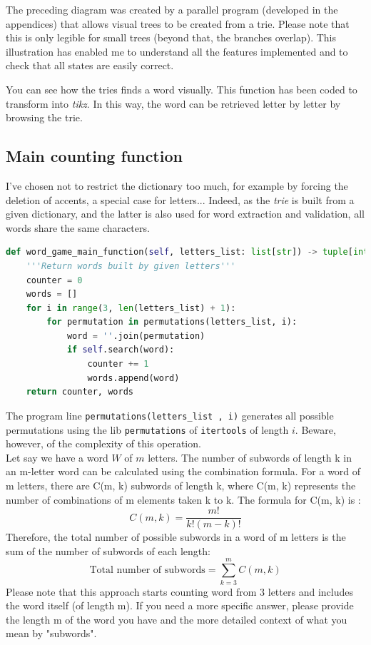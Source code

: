 \documentclass[10pt,a4paper,hidelinks]{article}
\begin{document}
The preceding diagram was created by a parallel program (developed in the appendices) that allows visual trees to be created from a trie. Please note that this is only legible for small trees (beyond that, the branches overlap). This illustration has enabled me to understand all the features implemented and to check that all states are easily correct.

You can see how the tries finds a word visually. This function has been coded to transform  into \textit{tikz}. In this way, the word can be retrieved letter by letter by browsing the trie.\\



\subsection{Main counting function}
I've chosen not to restrict the dictionary too much, for example by forcing the deletion of accents, a special case for letters... Indeed, as the \textit{trie} is built from a given dictionary, and the latter is also used for word extraction and validation, all words share the same characters.

\begin{lstlisting}[language=Python, caption=Test all permutations]
def word_game_main_function(self, letters_list: list[str]) -> tuple[int, list[str]]:
    '''Return words built by given letters'''
    counter = 0
    words = []
    for i in range(3, len(letters_list) + 1):
        for permutation in permutations(letters_list, i):
            word = ''.join(permutation)
            if self.search(word):
                counter += 1
                words.append(word)
    return counter, words
\end{lstlisting}

The program line \verb|permutations(letters_list , i)| generates all possible permutations using the lib \verb|permutations| of \verb|itertools| of length $i$. Beware, however, of the complexity of this operation.\\

Let say we have a word $W$ of $m$ letters.
The number of subwords of length k in an m-letter word can be calculated using the combination formula. For a word of m letters, there are C(m, k) subwords of length k, where C(m, k) represents the number of combinations of m elements taken k to k. The formula for C(m, k) is :
$$C(m, k) = \dfrac{m!}{k!(m - k)!}$$
Therefore, the total number of possible subwords in a word of m letters is the sum of the number of subwords of each length:
\begin{equation}
\text{Total number of subwords} = \sum_{k=3}^{m}C(m, k)
\label{eq:number_of_combination}
\end{equation}
Please note that this approach starts counting word from 3 letters and includes the word itself (of length m).
If you need a more specific answer, please provide the length m of the word you have and the more detailed context of what you mean by "subwords".

\end{document}
